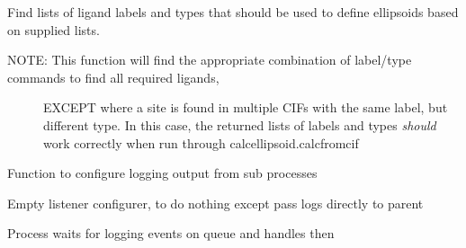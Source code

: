 \documentclass[a4paper,10pt,openany, oneside]{sphinxmanual}
\begin{document}

\begin{fulllineitems}
\label{api_reference:distellipsoid.multiCIF.check_ligands}
Find lists of ligand labels and types that should be used to define ellipsoids based on supplied lists.
\begin{description}
\item[{NOTE: This function will find the appropriate combination of label/type commands to find all required ligands,}] \leavevmode
EXCEPT where a site is found in multiple CIFs with the same label, but different type. In this case, the
returned lists of labels and types \emph{should} work correctly when run through calcellipsoid.calcfromcif

\end{description}

\end{fulllineitems}


\begin{fulllineitems}
\label{api_reference:distellipsoid.multiCIF.listener_configurer}
Function to configure logging output from sub processes

\end{fulllineitems}


\begin{fulllineitems}
\label{api_reference:distellipsoid.multiCIF.listener_empty_config}
Empty listener configurer, to do nothing except pass logs directly to parent

\end{fulllineitems}


\begin{fulllineitems}
\label{api_reference:distellipsoid.multiCIF.listener_process}
Process waits for logging events on queue and handles then

\end{fulllineitems}
\end{document}
